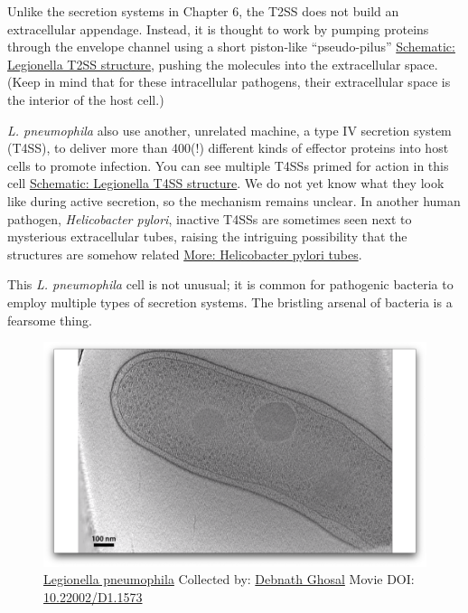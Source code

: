 \documentclass[]{tufte-book}
\begin{document}
Unlike the secretion systems in Chapter 6, the T2SS does not build an
extracellular appendage. Instead, it is thought to work by pumping
proteins through the envelope channel using a short piston-like
``pseudo-pilus''
\protect\hyperlink{Legionella_T2SS_structure}{Schematic: Legionella T2SS
structure}, pushing the molecules into the extracellular space. (Keep in
mind that for these intracellular pathogens, their extracellular space
is the interior of the host cell.)

\emph{L. pneumophila} also use another, unrelated machine, a type IV
secretion system (T4SS), to deliver more than 400(!) different kinds of
effector proteins into host cells to promote infection. You can see
multiple T4SSs primed for action in this cell
\protect\hyperlink{Legionella_T4SS_structure}{Schematic: Legionella T4SS
structure}. We do not yet know what they look like during active
secretion, so the mechanism remains unclear. In another human pathogen,
\emph{Helicobacter pylori}, inactive T4SSs are sometimes seen next to
mysterious extracellular tubes, raising the intriguing possibility that
the structures are somehow related
\protect\hyperlink{Helicobacter_pylori_tubes}{More: Helicobacter pylori
tubes}.

This \emph{L. pneumophila} cell is not unusual; it is common for
pathogenic bacteria to employ multiple types of secretion systems. The
bristling arsenal of bacteria is a fearsome thing.





\begin{figure}
\includegraphics{movie_stills/9_3} \caption[\protect\hyperlink{tree}{Legionella pneumophila} Collected by:
\protect\hyperlink{debnath_ghosal}{Debnath Ghosal} Movie DOI:
\href{https://doi.org/10.22002/D1.1573}{10.22002/D1.1573}]{\protect\hyperlink{tree}{Legionella pneumophila} Collected by:
\protect\hyperlink{debnath_ghosal}{Debnath Ghosal} Movie DOI:
\href{https://doi.org/10.22002/D1.1573}{10.22002/D1.1573}}\label{fig:9-3}
\end{figure}
\end{document}
